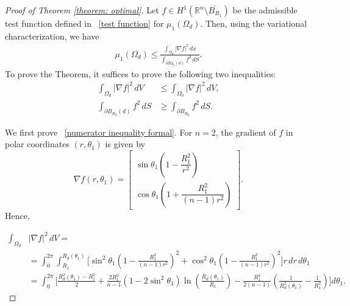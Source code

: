 \documentclass[12pt,reqno]{amsart}
\numberwithin{equation}{section}
\numberwithin{theorem}{section}
\numberwithin{equation}{section}
\numberwithin{theorem}{section}
\begin{document}
\begin{proof} [Proof of Theorem \ref{theorem: optimal}]
Let $f \in H^1(\mathbb{R}^n \setminus \overline{B_{R_1}})$ be the  admissible test function defined in ~\eqref{test function} for  $\mu_1(\Omega_d)$. Then, using the variational characterization, we have
\begin{align*}
     \mu_1(\Omega_d) \leq 
    \frac{\displaystyle \int_{\Omega_d} |\nabla f|^2 \, dx}
         {\displaystyle \int_{\partial B_{R_2}(d)} f^2 \, dS}.
\end{align*}
To prove the Theorem, it suffices to prove the following two inequalities:
\begin{align}
    \int_{\Omega_{d}} |\nabla f|^2 \, dV 
    &\leq 
    \int_{\Omega_{0}} |\nabla f|^2 \, dV, 
    \label{numerator inequality formal}
    \\[4pt]
    \int_{\partial B_{R_2}(d)} f^2 \, dS 
    &\geq 
    \int_{\partial B_{R_2}} f^2 \, dS.
    \label{denominator inequality formal}
\end{align}

\medskip
\noindent
We first prove ~\eqref{numerator inequality formal}.  
For $n = 2$, the gradient of $f$ in polar coordinates $(r, \theta_1)$ is given by
\[
\nabla f(r, \theta_1)
= 
\begin{bmatrix}
\sin \theta_1 \left( 1 - \dfrac{R_1^2}{r^2} \right) \\[4pt]
\cos \theta_1 \left( 1 + \dfrac{R_1^2}{(n-1)r^2} \right)
\end{bmatrix}.
\]
Hence,

{\small
\begin{align*}
    \int_{\Omega_d}& |\nabla f|^2 \, dV=\\
    &= 
    \int_{0}^{2\pi}\!\!\int_{R_1}^{R_d(\theta_1)} 
    \Big[
        \sin^2 \theta_1 \!\left( 1 - \tfrac{R_1^2}{(n-1)r^2} \right)^{\!2}
        + 
        \cos^2 \theta_1 \!\left( 1 - \tfrac{R_1^2}{(n-1)r^2} \right)^{\!2}
    \Big]
    r \, dr \, d\theta_1 \\
    &=
    \int_{0}^{2\pi}
    \Bigg[
        \frac{R_d^2(\theta_1) - R_1^2}{2}
        + 
        \frac{2R_1^2}{n-1} (1 - 2\sin^2 \theta_1)
        \ln\!\left( \frac{R_d(\theta_1)}{R_1} \right) 
        - 
        \frac{R_1^4}{2(n-1)} 
        \!\left( \frac{1}{R_d^2(\theta_1)} - \frac{1}{R_1^2} \right)
    \Bigg]
    d\theta_1.
\end{align*}}



\end{proof}
\end{document}
